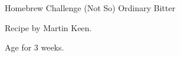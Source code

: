 \begin{recipe}{Homebrew Challenge (Not So) Ordinary Bitter} %

\begin{aboutblock}
Recipe by Martin Keen.
\sourcehomebrewchallenge
\end{aboutblock}


\begin{methodandtiming}

\begin{mashsteps}
\end{mashsteps}

\begin{fermentationsteps}
\end{fermentationsteps}

\begin{directions}
Age for 3 weeks.
\end{directions}

\end{methodandtiming}

\recipebreak

\begin{ingredientsblock}

\begin{malts}
\end{malts}

\begin{hops}
\end{hops}


\end{ingredientsblock}

\end{recipe}
